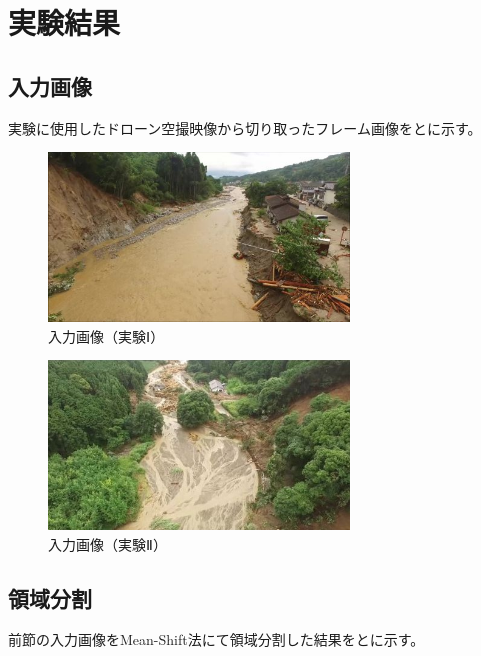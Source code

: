 \documentclass[../Thesis]{subfiles}
\begin{document}
\section{実験結果}
\subsection{入力画像}
実験に使用したドローン空撮映像から切り取ったフレーム画像をとに示す。

\begin{figure}[h]
	\centering
	\includegraphics[width=8cm]{img/original1.png}
	\caption{入力画像（実験Ⅰ）}
	\label{img01}
\end{figure}

\begin{figure}[h]
	\centering
	\includegraphics[width=8cm]{img/original2.png}
	\caption{入力画像（実験Ⅱ）}
	\label{img02}
\end{figure}


\subsection{領域分割}
前節の入力画像をMean-Shift法にて領域分割した結果をとに示す。
\end{document}
